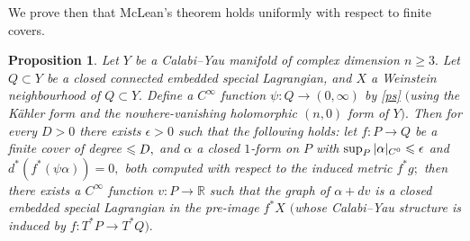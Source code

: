 \documentclass{article}
\theoremstyle{plain}%
\newtheorem{prop}[thm]{Proposition}
\theoremstyle{definition}
\numberwithin{equation}{section}
\numberwithin{figure}{section}
\def\eq{\eqref}
\def\l{\label}
\def\ge{\geqslant}
\def\le{\leqslant\nobreak}
\def\R{{\mathbin{\mathbb R}}}
\def\al{\alpha}
\def\ep{\epsilon}
\def\ps{\psi}
\def\iy{\infty}
\begin{document}
We prove then that McLean's theorem holds uniformly with respect to finite covers. 
\begin{prop}\l{prop: McLean and finite covers}
Let $Y$ be a Calabi--Yau manifold of complex dimension $n\ge3.$ Let $Q\subset Y$ be a closed connected embedded special Lagrangian, and $X$ a Weinstein neighbourhood of $Q\subset Y.$ Define a $C^\iy$ function $\ps:Q\to(0,\iy)$ by \eq{ps} $($using the K\"ahler form and the nowhere-vanishing holomorphic $(n,0)$ form of $Y).$ Then for every $D>0$ there exists $\ep>0$ such that the following holds: let $f:P\to Q$ be a finite cover of degree $\le D,$ and $\al$ a closed $1$-form on $P$ with $\sup_P|\al|_{C^0}\le \ep$ and $d^*(f^*(\ps \al))=0,$ both computed with respect to the induced metric $f^*g;$ then there exists a $C^\iy$ function $v:P\to\R$ such that the graph of $\al+dv$ is a closed embedded special Lagrangian in the pre-image $f^*X$ $($whose Calabi--Yau structure is induced by $f:T^*P\to T^*Q).$
\end{prop}
\end{document}
